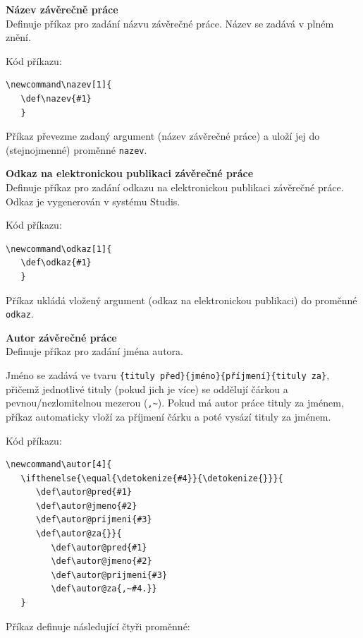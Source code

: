 \vspace{8pt}

\textbf{Název závěrečně práce}\\
Definuje příkaz pro zadání názvu závěrečné práce. Název se zadává v plném znění.

Kód příkazu:

\begin{verbatim}
\newcommand\nazev[1]{
   \def\nazev{#1}
   }
\end{verbatim}

Příkaz převezme zadaný argument (název závěrečné práce) a uloží jej do (stejnojmenné) proměnné \verb|nazev|.

\vspace{8pt}

\textbf{Odkaz na elektronickou publikaci závěrečné práce}\\
Definuje příkaz pro zadání odkazu na elektronickou publikaci závěrečné práce. Odkaz je vygenerován v systému Studis.

Kód příkazu:

\begin{verbatim}
\newcommand\odkaz[1]{
   \def\odkaz{#1}
   }
\end{verbatim}

Příkaz ukládá vložený argument (odkaz na elektronickou publikaci) do proměnné \verb|odkaz|.

\vspace{8pt}

\textbf{Autor závěrečné práce}\\
Definuje příkaz pro zadání jména autora.

Jméno se zadává ve tvaru \verb|{tituly před}{jméno}{příjmení}{tituly za}|, přičemž jednotlivé tituly (pokud jich je více) se oddělují čárkou a pevnou/nezlomitelnou mezerou (\verb|,~|). Pokud má autor práce tituly za jménem, příkaz automaticky vloží za příjmení čárku a poté vysází tituly za jménem.

Kód příkazu:

\begin{verbatim}
\newcommand\autor[4]{
   \ifthenelse{\equal{\detokenize{#4}}{\detokenize{}}}{
      \def\autor@pred{#1}
      \def\autor@jmeno{#2}
      \def\autor@prijmeni{#3}
      \def\autor@za{}}{
         \def\autor@pred{#1}
         \def\autor@jmeno{#2}
         \def\autor@prijmeni{#3}
         \def\autor@za{,~#4.}}
   }
\end{verbatim}

Příkaz definuje následující čtyři proměnné:

